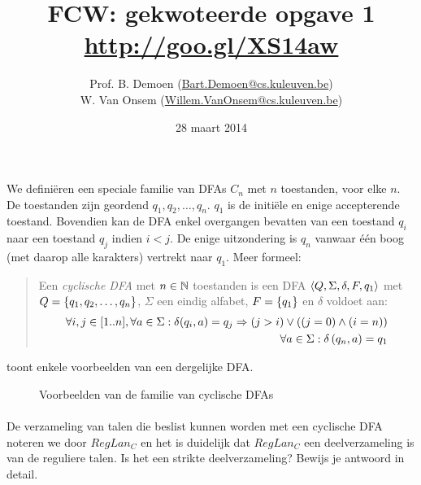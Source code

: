 \documentclass{article}
\title{FCW: gekwoteerde opgave 1\\\url{http://goo.gl/XS14aw}}
\author{Prof. B. Demoen (\url{Bart.Demoen@cs.kuleuven.be})\\ W. Van Onsem (\url{Willem.VanOnsem@cs.kuleuven.be})}
\date{28 maart 2014}
\begin{document}
\maketitle
\richtlijnen{}
\aboutanswers{}
\begin{question}[] We defini\"{e}ren een speciale familie van DFAs
$C_n$ met $n$ toestanden, voor elke $n$. De toestanden zijn geordend
$q_1,q_2,\ldots,q_n$. $q_1$ is de initi\"ele en enige accepterende
toestand. Bovendien kan de DFA enkel overgangen bevatten van een
toestand $q_i$ naar een toestand $q_j$ indien $i<j$. De enige
uitzondering is $q_n$ vanwaar \'{e}\'{e}n boog (met daarop alle
karakters) vertrekt naar $q_1$. Meer formeel:

\vspace{-0.5cm}
\begin{quote}\begin{definition}
Een \emph{cyclische DFA} met $n \in \mathbb{N}$ toestanden is een DFA
$\left\langle Q,\Sigma,\delta,F,q_1 \right\rangle$ met $Q=\left\{ q_1,q_2,\ldots,q_n \right\}$,
$\Sigma$ een eindig alfabet, $F=\left\{ q_1 \right\}$ en $\delta$ voldoet aan:
\begin{eqnarray}
\forall i,j \in [1..n], \forall a \in \Sigma: \delta(q_i,a) = q_j \Rightarrow (j>i) \vee ((j = 0) \wedge (i = n))\\
\forall a\in\Sigma:\delta\left( q_n,a \right)=q_1
\end{eqnarray}
\end{definition}\end{quote}
\begin{example}
 toont enkele voorbeelden van een dergelijke DFA.
\begin{figure}[hbt]
\centering
\caption{Voorbeelden van de familie van cyclische DFAs}
\end{figure}
\end{example}
\paragraph{}

De verzameling van talen die beslist kunnen worden met een cyclische
DFA noteren we door $RegLan_{C}$ en het is duidelijk dat $RegLan_{C}$
een deelverzameling is van de reguliere talen. Is het een strikte
deelverzameling? Bewijs je antwoord in detail.


\end{question}
\end{document}
